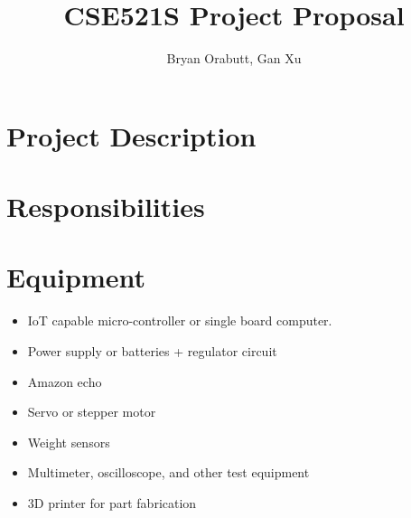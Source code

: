 \documentclass[notitlepage]{article}
\title{CSE521S Project Proposal}
\author{Bryan Orabutt, Gan Xu}
\begin{document}
\maketitle 
\section*{Project Description}

\section*{Responsibilities}

\section*{Equipment}
\begin{itemize}
\item IoT capable micro-controller or single board computer.
\item Power supply or batteries + regulator circuit
\item Amazon echo
\item Servo or stepper motor
\item Weight sensors
\item Multimeter, oscilloscope, and other test equipment
\item 3D printer for part fabrication
\end{itemize}
\end{document}
